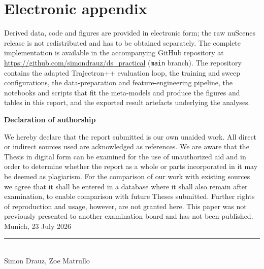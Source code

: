 \documentclass[12pt]{article}
\begin{document}
\newpage

\section{Electronic appendix}
\label{el_app}

Derived data, code and figures are provided in electronic form; the raw nuScenes release is not redistributed and has to be obtained separately. The complete implementation is available in the accompanying GitHub repository at \url{https://github.com/simondrauz/ds_practical} (\texttt{main} branch). The repository contains the adapted Trajectron++ evaluation loop, the training and sweep configurations, the data-preparation and feature-engineering pipeline, the notebooks and scripts that fit the meta-models and produce the figures and tables in this report, and the exported result artefacts underlying the analyses.

\newpage
    

\RaggedRight


\newpage


\Large
\noindent
\textbf{Declaration of authorship} 
\vspace{0.5cm}
\noindent
\normalsize

We hereby declare that the report submitted is our own unaided work. All direct
or indirect sources used are acknowledged as references. We are aware that the
Thesis in digital form can be examined for the use of unauthorized aid and in
order to determine whether the report as a whole or parts incorporated in it may
be deemed as plagiarism. For the comparison of our work with existing sources we
agree that it shall be entered in a database where it shall also remain after
examination, to enable comparison with future Theses submitted. Further rights
of reproduction and usage, however, are not granted here. This paper was not
previously presented to another examination board and has not been published.
\\

\vspace{1cm}
Munich, 23 July 2026 \\

\vspace{3cm}

\noindent\rule{0.5\textwidth}{0.4pt} \\

Simon Drauz, Zoe Matrullo

\end{document}
